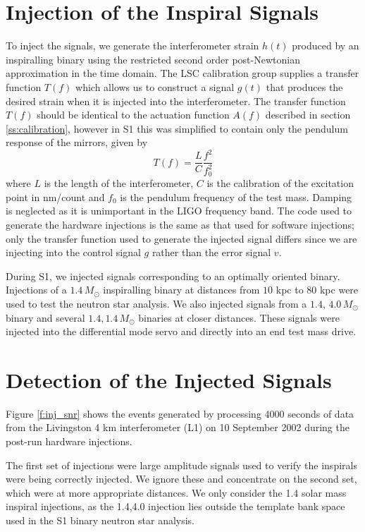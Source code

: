 \section{Injection of the Inspiral Signals}
\label{s:injecting}

To inject the signals, we generate the interferometer strain $h(t)$ produced
by an inspiralling binary using the restricted second order post-Newtonian
approximation in the time domain\cite{Blanchet:1996pi}.  The LSC calibration group
supplies a transfer function $T(f)$ which allows us to construct a signal
$g(t)$ that produces the desired strain when it is injected into the
interferometer.  The transfer function $T(f)$ should be identical to the
actuation function $A(f)$ described in section \ref{ss:calibration}, however
in S1 this was simplified to contain only the pendulum response of the mirrors,
given by 
\begin{equation}
T(f) = \frac{L}{C}\frac{f^2}{f_0^2}
\end{equation}
where $L$ is the length of the interferometer, $C$ is the calibration of the
excitation point in nm/count and $f_0$ is the pendulum frequency of the test
mass. Damping is neglected as it is unimportant in the LIGO frequency band.
The code used to generate the hardware injections is the same as that used
for software injections; only the transfer function used to generate the
injected signal differs since we are injecting into the control signal $g$
rather than the error signal $v$.

During S1, we injected signals corresponding to an optimally oriented binary.
Injections of a $1.4\,M_\odot$ inspiralling binary at distances from $10$
kpc to $80$ kpc were used to test the neutron star analysis.  We also injected
signals from a $1.4,\,4.0\,M_\odot$ binary and several $1.4,1.4\,M_\odot$
binaries at closer distances.  These signals were injected into the
differential mode servo and directly into an end test mass drive.

\section{Detection of the Injected Signals}
\label{s:detection}

Figure \ref{f:inj_snr} shows the events generated by processing 4000 seconds
of data from the Livingston 4 km interferometer (L1) on 10 September 2002
during the post-run hardware injections.

The first set of injections were large amplitude signals used to verify the
inspirals were being correctly injected. We ignore these and concentrate on
the second set, which were at more appropriate distances.  We only consider
the 1.4 solar mass inspiral injections, as the 1.4,4.0 injection lies
outside the template bank space used in the S1 binary neutron star analysis.

